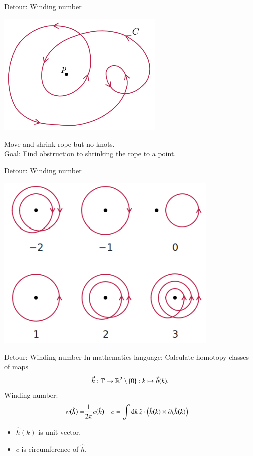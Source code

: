 \documentclass{beamer}
\begin{document}
\begin{frame}{Detour: Winding number}
	\begin{center}
		\includegraphics[width=0.6\textwidth]{Images/1200px-Winding_Number_Around_Point.svg.png}
	\end{center}
	Move and shrink rope but no knots.\\
	\pause
	Goal: Find obstruction to shrinking the rope to a point.
\end{frame}

\begin{frame}{Detour: Winding number}
	\begin{center}
		\includegraphics[width=0.8\textwidth]{Images/Winding-numbers-for-several-closed-oriented-curves-In-each-case-the-winding-number-is.png}
	\end{center}
\end{frame}

\begin{frame}{Detour: Winding number}
	In mathematics language: Calculate homotopy classes of maps
	\[\vec h:\mathbb{T}\rightarrow\mathbb{R}^2\setminus\{0\}:k\mapsto \vec h(k).\]
	\pause
	Winding number:
	\begin{align*}
		w(\hat{h})=&\frac{1}{2\pi} c(\hat{h})&c&=\int\textrm{d} k \: \hat{z}\cdot \left(\hat{h}(k)\times \partial_k \hat{h}(k)\right)
	\end{align*}
	\begin{itemize}
		\item $\hat{h}(k)$ is unit vector.
		\item $c$ is circumference of $\hat{h}$.
	\end{itemize}
	 
\end{frame}
\end{document}
